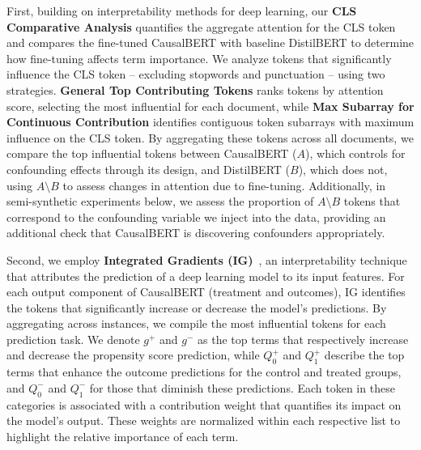 \documentclass[11pt]{article}
\begin{document}
First, building on interpretability methods for deep learning, our \textbf{CLS Comparative Analysis} quantifies the aggregate attention for the CLS token and compares the fine-tuned CausalBERT with baseline DistilBERT to determine how fine-tuning affects term importance. We analyze tokens that significantly influence the CLS token -- excluding stopwords and punctuation -- using two strategies. \textbf{General Top Contributing Tokens} ranks tokens by attention score, selecting the most influential for each document, while \textbf{Max Subarray for Continuous Contribution} identifies contiguous token subarrays with maximum influence on the CLS token.
By aggregating these tokens across all documents, we compare the top influential tokens between CausalBERT (\(A\)), which controls for confounding effects through its design, and DistilBERT (\(B\)), which does not, using \(A \setminus B\) to assess changes in attention due to fine-tuning. Additionally, in semi-synthetic experiments below, we assess the proportion of \(A \setminus B\) tokens that correspond to the confounding variable we inject into the data, providing an additional check that CausalBERT is discovering confounders appropriately.


Second, we employ \textbf{Integrated Gradients (IG)}~\cite{sundararajan2017axiomatic}, an interpretability technique that attributes the prediction of a deep learning model to its input features.
For each output component of CausalBERT (treatment and outcomes), IG identifies the tokens that significantly increase or decrease the model’s predictions. By aggregating across instances, we compile the most influential tokens for each prediction task. We denote $g^+$ and $g^-$ as the top terms that respectively increase and decrease the propensity score prediction, while $Q_{0}^+$ and $Q_{1}^+$ describe the top terms that enhance the outcome predictions for the control and treated groups, and $Q_{0}^-$ and $Q_{1}^-$ for those that diminish these predictions. Each token in these categories is associated with a contribution weight that quantifies its impact on the model's output. These weights are normalized within each respective list to highlight the relative importance of each term.
\end{document}
